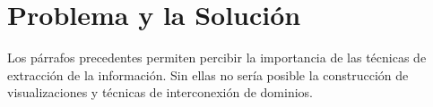 \documentclass[a4paper,12pt]{report}
\begin{document}
%
%
% 
%







\section{Problema y la Solución}

Los párrafos precedentes permiten percibir la importancia de las técnicas de extracción de la información. 
Sin ellas no sería posible la construcción de visualizaciones y técnicas de interconexión de dominios\cite{BRM10,MPMR07}.
\end{document}
